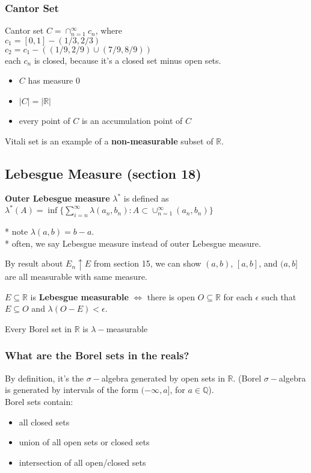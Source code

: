 \documentclass[a4paper, 12pt]{article}
\def\R{\ensuremath{\mathbb{R}}} %
\def\Q{\ensuremath{\mathbb{Q}}}
\newcommand{\bt}[1]{\textbf{#1}} %
\begin{document}
\begin{multicols}{2}
\subsubsection{Cantor Set}
Cantor set $C = \cap_{n=1}^\infty c_n$, where \\
$c_1 = [0, 1] - (1/3, 2/3) $\\
$c_2 = c_1 - ((1/9, 2/9) \cup (7/9, 8/9))$ \\

each $c_n$ is closed, because it's a closed set minus open sets.

\begin{itemize}
    \item $C$ has measure 0
    \item $|C| = |\R|$
    \item every point of $C$ is an accumulation point of $C$
\end{itemize}

Vitali set is an example of a \bt{non-measurable} subset of $\R$.

\subsection{Lebesgue Measure (section 18)}

\bt{Outer Lebesgue measure} $\lambda^*$ is defined as 
$\lambda^*(A) = \inf \{ \sum_{i=n}^\infty \lambda(a_n, b_n) : A \subset \cup_{n=1}^\infty (a_n, b_n)\}$ 

* note $\lambda(a, b) = b - a$.\\
* often, we say Lebesgue measure instead of outer Lebesgue measure. 

By result about $E_n \uparrow E$ from section 15, we can show 
$(a, b)$, $[a, b]$, and $(a, b]$ are all measurable with same measure.

$E \subseteq \R$ is \bt{Lebesgue measurable} $\iff$ there is open $O \subseteq \R$ for each $\epsilon$ such that 
$E \subseteq O$ and $\lambda(O - E) < \epsilon$.

Every Borel set in $\R$ is $\lambda-$measurable

\subsubsection{What are the Borel sets in the reals?}
By definition, it's the $\sigma-$algebra generated by open sets in $\R$.
(Borel $\sigma-$algebra is generated by intervals of the form $(-\infty, a]$, for 
$a \in \Q$). \\
Borel sets contain:
\begin{itemize}
    \item all closed sets 
    \item union of all open sets or closed sets
    \item intersection of all open/closed sets
\end{itemize}


\end{multicols}
\end{document}
